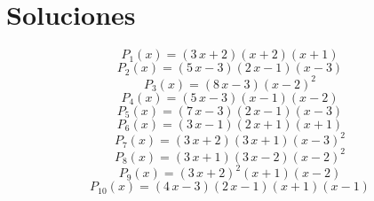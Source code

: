 \newpage\section{Soluciones}
\subitem \begin{dmath*}P_{1}(x) = {\left(3 \, x + 2\right)} {\left(x + 2\right)} {\left(x + 1\right)} \end{dmath*}\vspace{- 1.20000000000000 cm}
\subitem \begin{dmath*}P_{2}(x) = {\left(5 \, x - 3\right)} {\left(2 \, x - 1\right)} {\left(x - 3\right)} \end{dmath*}\vspace{- 1.20000000000000 cm}
\subitem \begin{dmath*}P_{3}(x) = {\left(8 \, x - 3\right)} {\left(x - 2\right)}^{2} \end{dmath*}\vspace{- 1.20000000000000 cm}
\subitem \begin{dmath*}P_{4}(x) = {\left(5 \, x - 3\right)} {\left(x - 1\right)} {\left(x - 2\right)} \end{dmath*}\vspace{- 1.20000000000000 cm}
\subitem \begin{dmath*}P_{5}(x) = {\left(7 \, x - 3\right)} {\left(2 \, x - 1\right)} {\left(x - 3\right)} \end{dmath*}\vspace{- 1.20000000000000 cm}
\subitem \begin{dmath*}P_{6}(x) = {\left(3 \, x - 1\right)} {\left(2 \, x + 1\right)} {\left(x + 1\right)} \end{dmath*}\vspace{- 1.20000000000000 cm}
\subitem \begin{dmath*}P_{7}(x) = {\left(3 \, x + 2\right)} {\left(3 \, x + 1\right)} {\left(x - 3\right)}^{2} \end{dmath*}\vspace{- 1.20000000000000 cm}
\subitem \begin{dmath*}P_{8}(x) = {\left(3 \, x + 1\right)} {\left(3 \, x - 2\right)} {\left(x - 2\right)}^{2} \end{dmath*}\vspace{- 1.20000000000000 cm}
\subitem \begin{dmath*}P_{9}(x) = {\left(3 \, x + 2\right)}^{2} {\left(x + 1\right)} {\left(x - 2\right)} \end{dmath*}\vspace{- 1.20000000000000 cm}
\subitem \begin{dmath*}P_{10}(x) = {\left(4 \, x - 3\right)} {\left(2 \, x - 1\right)} {\left(x + 1\right)} {\left(x - 1\right)} \end{dmath*}\vspace{- 1.20000000000000 cm}

